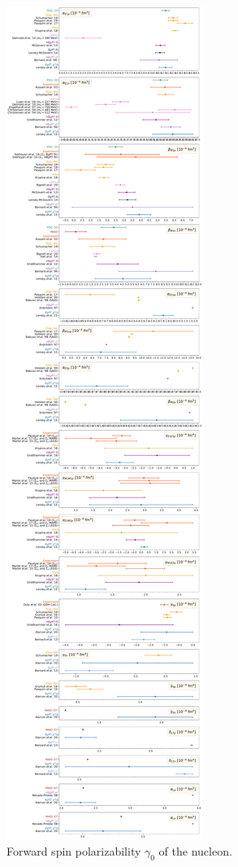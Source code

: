 \documentclass[preprints,review,accept,moreauthors,pdftex]{Definitions/mdpi}
\def\ga{\gamma} \def\Ga{{\it\Gamma}}
\begin{document}
\begin{figure}[t]
\centering
\includegraphics[width=\columnwidth]{Figures/Gamma0Pol.pdf}
\caption{Forward spin polarizability $\ga_0$ of the nucleon. \label{Gamma0Pol}}
\end{figure} 
\end{document}
